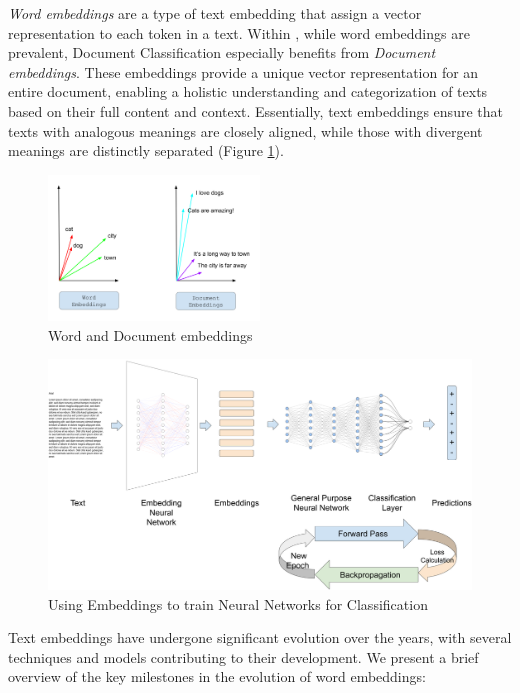 \emph{Word embeddings} are a type of text embedding that assign a vector representation to each token in a text.
Within \textclassification{}, while word embeddings are prevalent, Document Classification especially benefits from \emph{Document embeddings}. These embeddings provide a unique vector representation for an entire document, enabling a holistic understanding and categorization of texts based on their full content and context. 
Essentially, text embeddings ensure that texts with analogous meanings are closely aligned, while those with divergent meanings are distinctly separated (Figure \ref{fig:word_and_document_embeddings}).


\begin{figure}
    \centering
    \includegraphics[width=0.5\textwidth]{Figures/02/02_embeddings.png}
    \caption{Word and Document embeddings}
    \label{fig:word_and_document_embeddings}
\end{figure}

\begin{figure}
    \centering
    \includegraphics[width=\textwidth]{Figures/02/02_nns_for_nlp.png}
    \caption{Using Embeddings to train Neural Networks for Classification}
    \label{fig:02_embeddings_for_training_classification}
\end{figure}

Text embeddings have undergone significant evolution over the years, with several techniques and models contributing to their development. We present a brief overview of the key milestones in the evolution of word embeddings:


